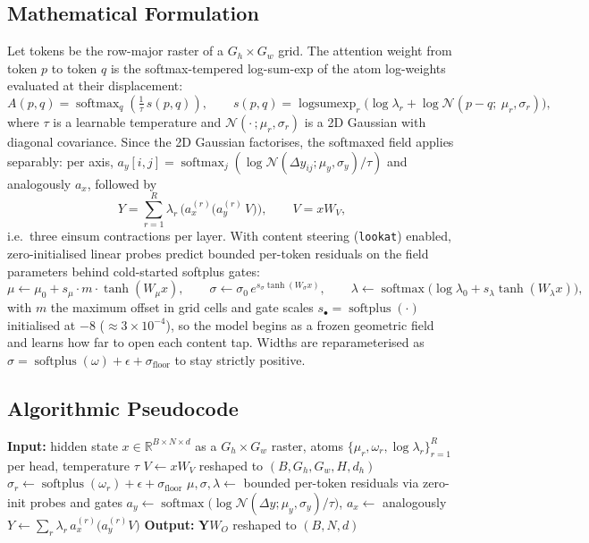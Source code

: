 \subsection{Mathematical Formulation}
Let tokens be the row-major raster of a $G_h \times G_w$ grid. The attention weight from token $p$ to token $q$ is the softmax-tempered log-sum-exp of the atom log-weights evaluated at their displacement:
\[
A(p, q) = \operatorname{softmax}_q\!\left( \tfrac{1}{\tau}\, s(p, q) \right),
\qquad
s(p, q) = \operatorname{logsumexp}_r \big( \log \lambda_r + \log \mathcal{N}(p - q;\ \mu_r, \sigma_r) \big),
\]
where $\tau$ is a learnable temperature and $\mathcal{N}(\cdot\,;\mu_r, \sigma_r)$ is a 2D Gaussian with diagonal covariance. Since the 2D Gaussian factorises, the softmaxed field applies separably: per axis, $a_y[i, j] = \operatorname{softmax}_j(\log \mathcal{N}(\Delta y_{ij}; \mu_y, \sigma_y) / \tau)$ and analogously $a_x$, followed by
\[
Y = \sum_{r=1}^{R} \lambda_r\, \big( a_x^{(r)} \big( a_y^{(r)}\, V \big) \big),
\qquad V = x W_V,
\]
i.e.\ three einsum contractions per layer. With content steering (\texttt{lookat}) enabled, zero-initialised linear probes predict bounded per-token residuals on the field parameters behind cold-started softplus gates:
\[
\mu \leftarrow \mu_0 + s_\mu \cdot m \cdot \tanh(W_\mu x), \qquad
\sigma \leftarrow \sigma_0 \, e^{s_\sigma \tanh(W_\sigma x)}, \qquad
\lambda \leftarrow \operatorname{softmax}\big( \log \lambda_0 + s_\lambda \tanh(W_\lambda x) \big),
\]
with $m$ the maximum offset in grid cells and gate scales $s_\bullet = \operatorname{softplus}(\cdot)$ initialised at $-8$ ($\approx 3 \times 10^{-4}$), so the model begins as a frozen geometric field and learns how far to open each content tap. Widths are reparameterised as $\sigma = \operatorname{softplus}(\omega) + \epsilon + \sigma_{\text{floor}}$ to stay strictly positive.

\subsection{Algorithmic Pseudocode}
\begin{algorithmic}[1]
\State \textbf{Input:} hidden state $x \in \mathbb{R}^{B \times N \times d}$ as a $G_h \times G_w$ raster, atoms $\{\mu_r, \omega_r, \log \lambda_r\}_{r=1}^{R}$ per head, temperature $\tau$
\State $V \gets x W_V$ reshaped to $(B, G_h, G_w, H, d_h)$ 
\State $\sigma_r \gets \operatorname{softplus}(\omega_r) + \epsilon + \sigma_{\text{floor}}$ 
    \State $\mu, \sigma, \lambda \gets$ bounded per-token residuals via zero-init probes and gates 
\EndIf
\State $a_y \gets \operatorname{softmax}\!\big(\log \mathcal{N}(\Delta y; \mu_y, \sigma_y) / \tau\big)$, \quad $a_x \gets$ analogously 
\State $Y \gets \sum_r \lambda_r\, a_x^{(r)} \big( a_y^{(r)} V \big)$ 
\State \textbf{Output:} $\mathbf{Y} W_O$ reshaped to $(B, N, d)$
\end{algorithmic}

